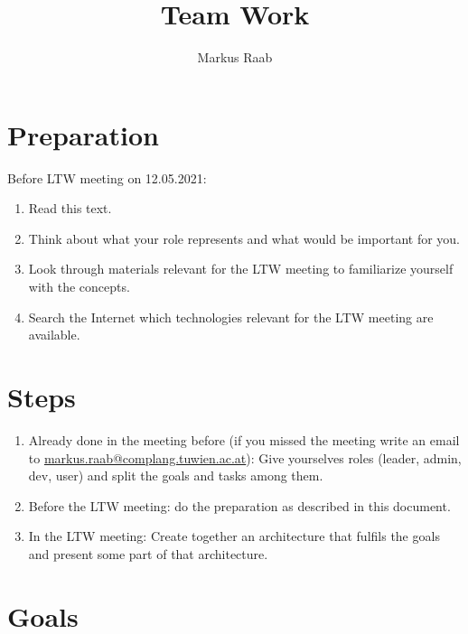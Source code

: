 



\setcounter{chapter}{1} %



\title{Team Work}
\author{Markus Raab}




\maketitle
\doclicenseThis

\section{Preparation}

Before LTW meeting on 12.05.2021:

\begin{enumerate}
	\item Read this text.
	\item Think about what your role represents and what would be important for you.
	\item Look through materials relevant for the LTW meeting to familiarize yourself with the concepts.
	\item Search the Internet which technologies relevant for the LTW meeting are available.
\end{enumerate}

\section{Steps}

\begin{enumerate}
	\item Already done in the meeting before (if you missed the meeting write an email to \url{markus.raab@complang.tuwien.ac.at}):
	Give yourselves roles (leader, admin, dev, user) and split the goals and tasks among them.
	\item Before the LTW meeting: do the preparation as described in this document.
	\item In the LTW meeting: Create together an architecture that fulfils the goals and present some part of that architecture.
\end{enumerate}

\section{Goals}

